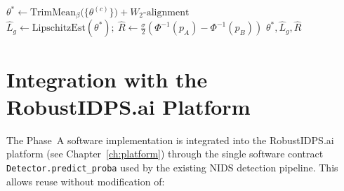 \begin{algorithm}[H]
\caption{Unified training procedure for a single federated round
(UAV-specific instantiation of Algorithm~\ref{alg:unified}).}
\label{alg:uav_unified_round}
$\theta^{*}\leftarrow \mathrm{TrimMean}_{\beta}\bigl(\{\theta^{(c)}\}\bigr)
  + W_2\text{-alignment}$
$\hat L_g \leftarrow \mathrm{LipschitzEst}(\theta^{*});\
  \hat R \leftarrow \tfrac{\sigma}{2}(\Phi^{-1}(p_A)-\Phi^{-1}(p_B))$\;
\Return $\theta^{*},\hat L_g,\hat R$\;
\end{algorithm}


\section{Integration with the \textsf{RobustIDPS.ai} Platform}
\label{sec:uav_robustidps_integration}

The Phase~A software implementation is integrated into the
\textsf{RobustIDPS.ai} platform (see Chapter~\ref{ch:platform})
through the single software contract
\texttt{Detector.predict\_proba} used by the existing NIDS detection
pipeline. This allows reuse without modification of:

